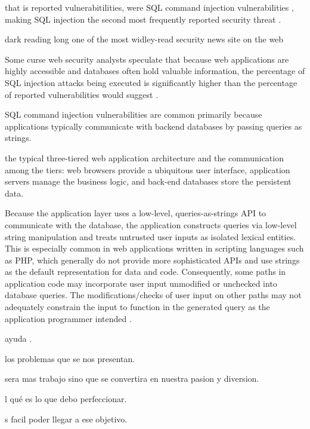 \documentclass[12pt]{article}
\begin{document}
that is reported vulnerabitilities, were SQL command injection vulnerabilities , making SQL injection the second most frequently reported security threat .

dark reading 
long one of the most  widley-read security news site on the web


 Some curse
web security analysts speculate that because web applications are
highly accessible and databases often hold valuable information,
the percentage of SQL injection attacks being executed is significantly higher than the percentage of reported vulnerabilities would
suggest .


SQL command injection vulnerabilities are common primarily because applications typically communicate with backend databases by passing queries as strings.


 the typical three-tiered web application architecture
and  the communication among the tiers: web browsers provide a ubiquitous user interface, application servers manage the
business logic, and back-end databases store the persistent data.

Because the application layer uses a low-level, queries-as-strings API to communicate with the database, the application constructs queries via low-level string manipulation and treats untrusted user inputs as isolated lexical entities. This is especially common in web applications written in scripting languages such as PHP, which
generally do not provide more sophisticated APIs and use strings as the default representation for data and code. Consequently, some paths in application code may incorporate user input unmodified or unchecked into database queries. The modifications/checks of user input on other paths may not adequately constrain the input to function in the generated query as the application programmer
intended .



\vspace{10PT}
 ayuda .

\vspace{15PT}
 los problemas que se nos presentan.

\vspace{15PT}
 sera mas trabajo sino que se convertira en nuestra pasion y diversion.

\vspace{15PT}
l qué es lo que debo perfeccionar.

\vspace{15PT}
s facil poder llegar a ese objetivo.
 
\end{document}
